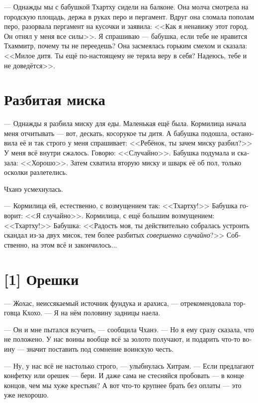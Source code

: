 \documentclass[a4paper,12pt,fleqn]{book}\usepackage{polyglossia}\setdefaultlanguage[babelshorthands=true]{russian}\setotherlanguage{english}\defaultfontfeatures{Ligatures=TeX,Mapping=tex-text}\usepackage{xcolor}\newcommand{\ml}[3]{#2}
\begin{document}
{--- Однажды мы с бабушкой Тхартху сидели на балконе.
Она молча смотрела на городскую площадь, держа в руках перо и пергамент.
Вдруг она сломала пополам перо, разорвала пергамент на кусочки и заявила: <<Как я ненавижу этот город.
Он отнял у меня все силы>>.
Я спрашиваю --- бабушка, если тебе не нравится Тхаммитр, почему ты не переедешь?
Она засмеялась горьким смехом и сказала: <<Милое дитя.
\ml{$0$}
{Ты ещё по-настоящему не теряла веру в себя?}
{You haven't lost you confidence, have you?}
\ml{$0$}
{Надеюсь, тебе и не доведётся>>.}
{I wish you never have.''}

\section{Разбитая миска}

--- Однажды я разбила миску для еды.
Маленькая ещё была.
Кормилица начала меня отчитывать --- вот, дескать, косорукое ты дитя.
А бабушка подошла, остановила её и так строго у меня спрашивает: <<Ребёнок, ты зачем миску разбил?>>
У меня всё внутри сжалось.
Говорю: <<Случайно>>.
Бабушка подумала и сказала: <<Хорошо>>.
Затем схватила вторую миску и шварк её об пол, только осколки разлетелись.

Чханэ усмехнулась.

--- Кормилица ей, естественно, с возмущением так: <<Тхартху!>>
Бабушка говорит: <<Я случайно>>.
Кормилица, с ещё большим возмущением: <<Тхартху!>>
Бабушка: <<Радость моя, ты действительно собралась устроить скандал из-за двух мисок, тем более разбитых \textit{совершенно случайно}?>>
Собственно, на этом всё и закончилось...

\section{[1] Орешки}

--- Жохас, неиссякаемый источник фундука и арахиса, --- отрекомендовала торговца Кхохо.
--- Я на нём половину задницы наела.

--- Он и мне пытался всучить, --- сообщила Чханэ.
--- Но я ему сразу сказала, что не положено.
У нас воины вообще всё за золото получают, и подарить что-то воину --- значит поставить под сомнение воинскую честь.

--- Ну, у нас всё не настолько строго, --- улыбнулась Хитрам.
--- Если предлагают конфетку или орешек --- бери.
И даже сама не стесняйся пробовать --- в конце концов, чем мы хуже крестьян?
А вот что-то крупнее брать без оплаты --- это уже нехорошо.

}
\end{document}
